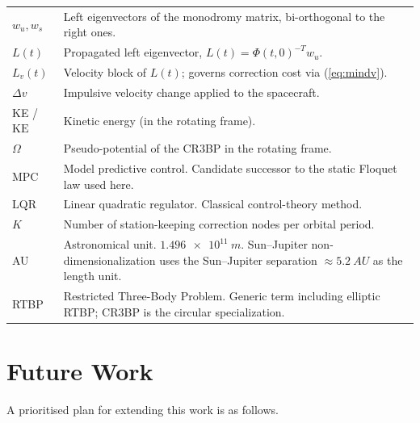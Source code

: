 \documentclass[11pt,a4paper]{article}
\begin{document}
\begin{longtable}{@{}l p{}@{}}
$w_u, w_s$ & Left eigenvectors of the monodromy matrix, bi-orthogonal to the right ones. \\
$L(t)$ & Propagated left eigenvector, $L(t) = \Phi(t,0)^{-T} w_u$. \\
$L_v(t)$ & Velocity block of $L(t)$; governs correction cost via (\ref{eq:mindv}). \\
$\Delta v$ & Impulsive velocity change applied to the spacecraft. \\
KE / $\mathrm{KE}$ & Kinetic energy (in the rotating frame). \\
$\Omega$ & Pseudo-potential of the CR3BP in the rotating frame. \\
MPC & Model predictive control. Candidate successor to the static Floquet law used here. \\
LQR & Linear quadratic regulator. Classical control-theory method. \\
$K$ & Number of station-keeping correction nodes per orbital period. \\
AU & Astronomical unit. $\SI{1.496e11}{m}$. Sun--Jupiter non-dimensionalization uses the Sun--Jupiter separation $\approx \SI{5.2}{AU}$ as the length unit. \\
RTBP & Restricted Three-Body Problem. Generic term including elliptic RTBP; CR3BP is the circular specialization. \\
\bottomrule
\end{longtable}

\section{Future Work}\label{sec:future}

A prioritised plan for extending this work is as follows.
\end{document}
